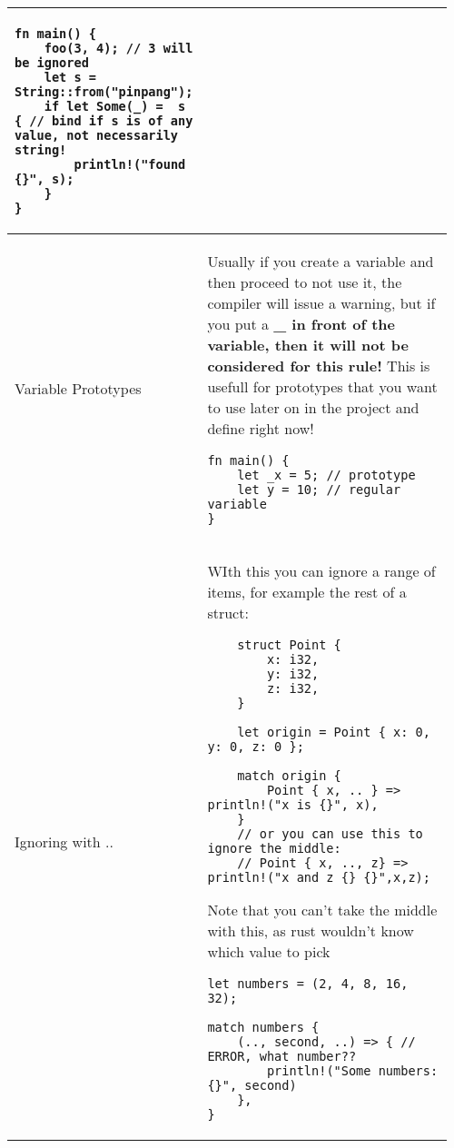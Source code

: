 \documentclass[main.tex,fontsize=8pt,paper=a4,paper=portrait,DIV=calc,]{scrartcl}
\begin{document}
\begin{table}[ht!]
\begin{tabular}{|m{0.2\linewidth}|m{0.755\linewidth}|}
\begin{lstlisting}
fn main() {
    foo(3, 4); // 3 will be ignored
    let s = String::from("pinpang");
    if let Some(_) =  s { // bind if s is of any value, not necessarily string!
        println!("found {}", s);
    }
}
\end{lstlisting}\\
\hline
Variable Prototypes & 
\textcolor{OliveGreen}{Usually if you create a variable and then proceed to not use it, the compiler will issue a warning, but if you put a \textbf{\_ in front of the variable, then it will not be considered for this rule!}}\newline
This is usefull for prototypes that you want to use later on in the project and define right now!\newline
\begin{lstlisting}
fn main() {
    let _x = 5; // prototype
    let y = 10; // regular variable
}
\end{lstlisting}\\
\hline
Ignoring with .. & 
WIth this you can ignore a range of items, for example the rest of a struct:\newline
\begin{lstlisting}
    struct Point {
        x: i32,
        y: i32,
        z: i32,
    }

    let origin = Point { x: 0, y: 0, z: 0 };

    match origin {
        Point { x, .. } => println!("x is {}", x),
    }
    // or you can use this to ignore the middle:
    // Point { x, .., z} => println!("x and z {} {}",x,z);
\end{lstlisting} 
\textcolor{OliveGreen}{Note that you can't take the middle with this, as rust wouldn't know which value to pick}\newline
\begin{lstlisting}
let numbers = (2, 4, 8, 16, 32);

match numbers {
    (.., second, ..) => { // ERROR, what number??
        println!("Some numbers: {}", second)
    },
}
\end{lstlisting}\\
\hline
\end{tabular}
\end{table}
\pagebreak
\end{document}
